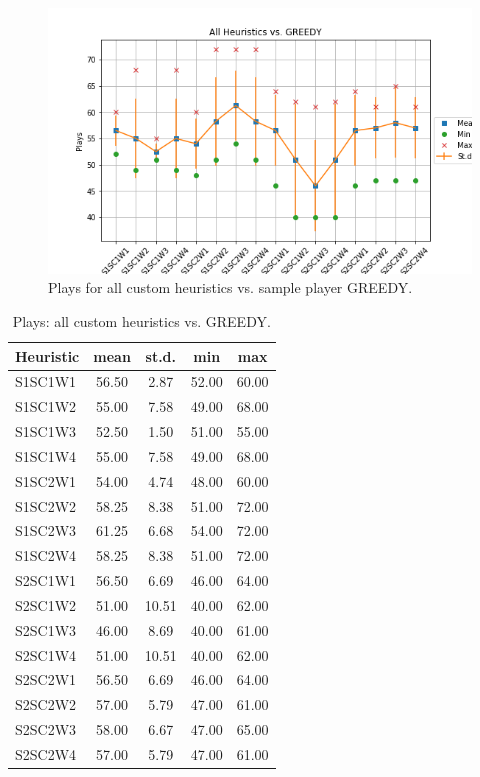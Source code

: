 \documentclass[a4paper]{article}
\begin{document}
    


\begin{figure}[htpb]
\begin{center}
\includegraphics[width=1\columnwidth]{fig/results_Plays_All_vs_GREEDY.png}
\caption{Plays for all custom heuristics vs. sample player GREEDY.}
\end{center}
\label{figplyesGREEDY}
\end{figure}
    

    \begin{table}[htpb]
    \caption{ Plays: all custom heuristics vs. GREEDY.}
    \centering
    \begin{tabular}{ l | c c c c }
    Heuristic & mean & st.d. & min & max \\ \hline 
    S1SC1W1 & 56.50 & 2.87 & 52.00 & 60.00 \\
    S1SC1W2 & 55.00 & 7.58 & 49.00 & 68.00 \\
    S1SC1W3 & 52.50 & 1.50 & 51.00 & 55.00 \\
    S1SC1W4 & 55.00 & 7.58 & 49.00 & 68.00 \\
    S1SC2W1 & 54.00 & 4.74 & 48.00 & 60.00 \\
    S1SC2W2 & 58.25 & 8.38 & 51.00 & 72.00 \\
    S1SC2W3 & 61.25 & 6.68 & 54.00 & 72.00 \\
    S1SC2W4 & 58.25 & 8.38 & 51.00 & 72.00 \\
    S2SC1W1 & 56.50 & 6.69 & 46.00 & 64.00 \\
    S2SC1W2 & 51.00 & 10.51 & 40.00 & 62.00 \\
    S2SC1W3 & 46.00 & 8.69 & 40.00 & 61.00 \\
    S2SC1W4 & 51.00 & 10.51 & 40.00 & 62.00 \\
    S2SC2W1 & 56.50 & 6.69 & 46.00 & 64.00 \\
    S2SC2W2 & 57.00 & 5.79 & 47.00 & 61.00 \\
    S2SC2W3 & 58.00 & 6.67 & 47.00 & 65.00 \\
    S2SC2W4 & 57.00 & 5.79 & 47.00 & 61.00 
    \end{tabular}
    \label{tabplaysGREEDY}
    \end{table}

    
\end{document}

